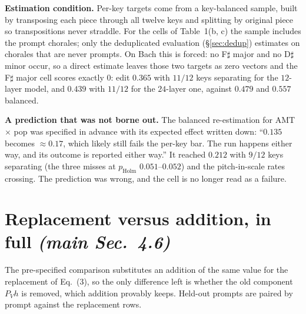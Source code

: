 \documentclass{article}
\begin{document}
\textbf{Estimation condition.} Per-key targets come from a key-balanced sample, built
by transposing each piece through all twelve keys and splitting by original piece so
transpositions never straddle. For the cells of Table~1(b, c) the sample includes the
prompt chorales; only the deduplicated evaluation (\S\ref{sec:dedup}) estimates on
chorales that are never prompts. On Bach this is forced: no F$\sharp$ major and no
D$\sharp$ minor occur, so a direct estimate leaves those two targets as zero vectors
and the F$\sharp$ major cell scores exactly $0$: edit $0.365$ with $11/12$ keys
separating for the $12$-layer model, and $0.439$ with $11/12$ for the $24$-layer one,
against $0.479$ and $0.557$ balanced.

\textbf{A prediction that was not borne out.} The balanced re-estimation for AMT
$\times$ pop was specified in advance with its expected effect written down: ``$0.135$
becomes $\approx0.17$, which likely still fails the per-key bar. The run happens either
way, and its outcome is reported either way.'' It reached $0.212$ with $9/12$ keys
separating (the three misses at $p_{\text{Holm}}$ $0.051$--$0.052$) and the
pitch-in-scale rates crossing. The prediction was wrong, and the cell is no longer read
as a failure.

\section{Replacement versus addition, in full \normalfont\textit{(main Sec.~4.6)}}
\label{sec:steering}

%
The pre-specified comparison substitutes an addition of the same value for the
replacement of Eq.~(3), so the only difference left is whether the old component $P_Vh$
is removed, which addition provably keeps. Held-out prompts are paired by prompt against
the replacement rows.
\end{document}
